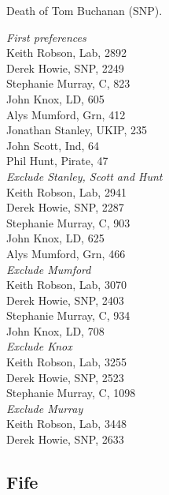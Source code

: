 \documentclass[a4paper,openany,10pt]{book}
\begin{document}

Death of Tom Buchanan (SNP).



\emph{First preferences}\\
Keith Robson, Lab, 2892\\
Derek Howie, SNP, 2249\\
Stephanie Murray, C, 823\\
John Knox, LD, 605\\
Alys Mumford, Grn, 412\\
Jonathan Stanley, UKIP, 235\\
John Scott, Ind, 64\\
Phil Hunt, Pirate, 47\\




\emph{Exclude Stanley, Scott and Hunt}\\
Keith Robson, Lab, 2941\\
Derek Howie, SNP, 2287\\
Stephanie Murray, C, 903\\
John Knox, LD, 625\\
Alys Mumford, Grn, 466\\




\emph{Exclude Mumford}\\
Keith Robson, Lab, 3070\\
Derek Howie, SNP, 2403\\
Stephanie Murray, C, 934\\
John Knox, LD, 708\\




\emph{Exclude Knox}\\
Keith Robson, Lab, 3255\\
Derek Howie, SNP, 2523\\
Stephanie Murray, C, 1098\\




\emph{Exclude Murray}\\
Keith Robson, Lab, 3448\\
Derek Howie, SNP, 2633\\




\subsection*{Fife}
\end{document}
